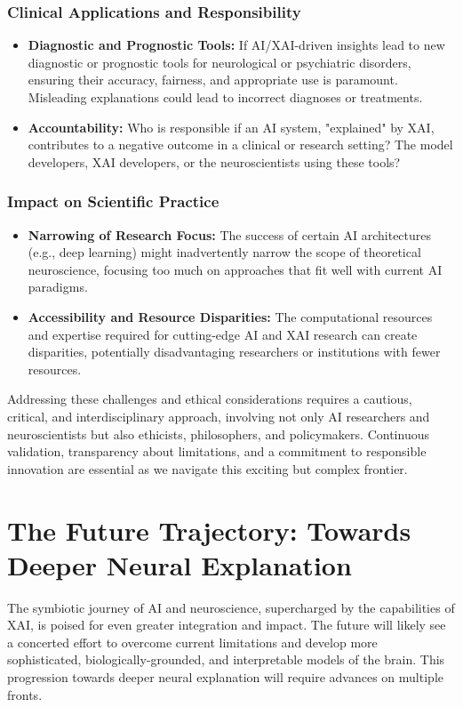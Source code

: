 \documentclass[11pt,a4paper]{article}
\begin{document}
\subsubsection{Clinical Applications and Responsibility}
\begin{itemize}
    \item \textbf{Diagnostic and Prognostic Tools:} If AI/XAI-driven insights lead to new diagnostic or prognostic tools for neurological or psychiatric disorders, ensuring their accuracy, fairness, and appropriate use is paramount. Misleading explanations could lead to incorrect diagnoses or treatments.
    \item \textbf{Accountability:} Who is responsible if an AI system, "explained" by XAI, contributes to a negative outcome in a clinical or research setting? The model developers, XAI developers, or the neuroscientists using these tools?
\end{itemize}

\subsubsection{Impact on Scientific Practice}
\begin{itemize}
    \item \textbf{Narrowing of Research Focus:} The success of certain AI architectures (e.g., deep learning) might inadvertently narrow the scope of theoretical neuroscience, focusing too much on approaches that fit well with current AI paradigms.
    \item \textbf{Accessibility and Resource Disparities:} The computational resources and expertise required for cutting-edge AI and XAI research can create disparities, potentially disadvantaging researchers or institutions with fewer resources.
\end{itemize}
Addressing these challenges and ethical considerations requires a cautious, critical, and interdisciplinary approach, involving not only AI researchers and neuroscientists but also ethicists, philosophers, and policymakers. Continuous validation, transparency about limitations, and a commitment to responsible innovation are essential as we navigate this exciting but complex frontier.

\section{The Future Trajectory: Towards Deeper Neural Explanation}

The symbiotic journey of AI and neuroscience, supercharged by the capabilities of XAI, is poised for even greater integration and impact. The future will likely see a concerted effort to overcome current limitations and develop more sophisticated, biologically-grounded, and interpretable models of the brain. This progression towards deeper neural explanation will require advances on multiple fronts.
\end{document}
